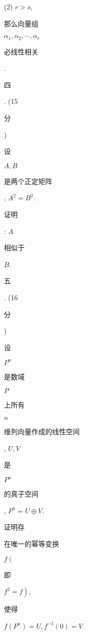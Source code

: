 \documentclass[10pt]{article}
\begin{document}
(2) $r>s$,

\begin{CJK}{UTF8}{mj}那么向量组\end{CJK} $\alpha_{1}, \alpha_{2}, \cdots, \alpha_{r}$ \begin{CJK}{UTF8}{mj}必线性相关\end{CJK}.

\begin{CJK}{UTF8}{mj}四\end{CJK}. (15 \begin{CJK}{UTF8}{mj}分\end{CJK}) \begin{CJK}{UTF8}{mj}设\end{CJK} $A, B$ \begin{CJK}{UTF8}{mj}是两个正定矩阵\end{CJK}, $A^{2}=B^{2}$. \begin{CJK}{UTF8}{mj}证明\end{CJK}: $A$ \begin{CJK}{UTF8}{mj}相似于\end{CJK} $B$.

\begin{CJK}{UTF8}{mj}五\end{CJK}. (16 \begin{CJK}{UTF8}{mj}分\end{CJK}) \begin{CJK}{UTF8}{mj}设\end{CJK} $P^{n}$ \begin{CJK}{UTF8}{mj}是数域\end{CJK} $P$ \begin{CJK}{UTF8}{mj}上所有\end{CJK} $n$ \begin{CJK}{UTF8}{mj}维列向量作成的线性空间\end{CJK}, $U, V$ \begin{CJK}{UTF8}{mj}是\end{CJK} $P^{n}$ \begin{CJK}{UTF8}{mj}的真子空间\end{CJK}, $P^{n}=U \oplus V$. \begin{CJK}{UTF8}{mj}证明存\end{CJK} \begin{CJK}{UTF8}{mj}在唯一的幂等变换\end{CJK} $f\left(\right.$ \begin{CJK}{UTF8}{mj}即\end{CJK} $\left.f^{2}=f\right)$, \begin{CJK}{UTF8}{mj}使得\end{CJK} $f\left(P^{n}\right)=U, f^{-1}(0)=V$.
\end{document}
